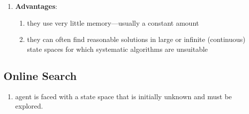 \begin{enumerate}
    \item \textbf{Advantages}: 
    \begin{enumerate}
        \item they use very little memory—usually a constant amount
        \hfill \cite{ai/book/Artificial-Intelligence-A-Modern-Approach/Russell-Norvig}

        \item they can often find reasonable solutions in large or infinite (continuous) state spaces for which systematic algorithms are unsuitable
        \hfill \cite{ai/book/Artificial-Intelligence-A-Modern-Approach/Russell-Norvig}
    \end{enumerate}
\end{enumerate}





\subsection{Online Search}

\begin{enumerate}
    \item agent is faced with a state space that is initially unknown and must be explored.
    \hfill \cite{ai/book/Artificial-Intelligence-A-Modern-Approach/Russell-Norvig}

    
    
\end{enumerate}














